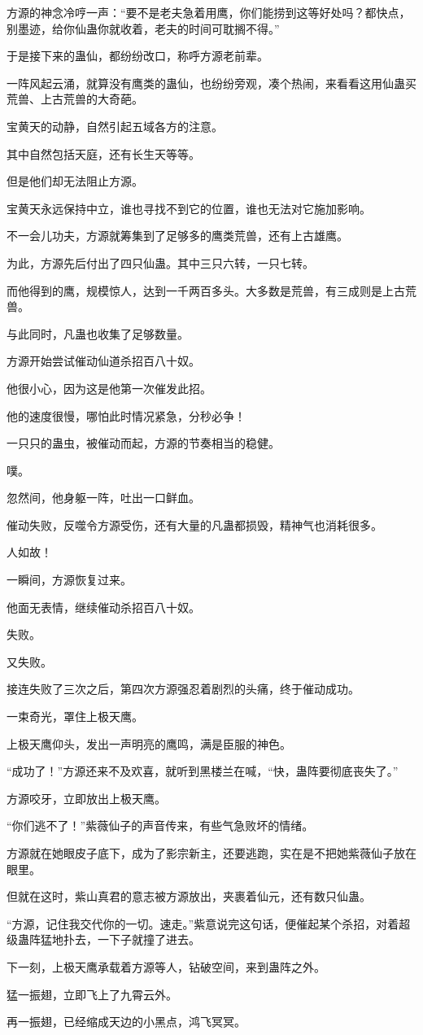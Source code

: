 \begin{this_body}
方源的神念冷哼一声：“要不是老夫急着用鹰，你们能捞到这等好处吗？都快点，别墨迹，给你仙蛊你就收着，老夫的时间可耽搁不得。”

于是接下来的蛊仙，都纷纷改口，称呼方源老前辈。

一阵风起云涌，就算没有鹰类的蛊仙，也纷纷旁观，凑个热闹，来看看这用仙蛊买荒兽、上古荒兽的大奇葩。

宝黄天的动静，自然引起五域各方的注意。

其中自然包括天庭，还有长生天等等。

但是他们却无法阻止方源。

宝黄天永远保持中立，谁也寻找不到它的位置，谁也无法对它施加影响。

不一会儿功夫，方源就筹集到了足够多的鹰类荒兽，还有上古雄鹰。

为此，方源先后付出了四只仙蛊。其中三只六转，一只七转。

而他得到的鹰，规模惊人，达到一千两百多头。大多数是荒兽，有三成则是上古荒兽。

与此同时，凡蛊也收集了足够数量。

方源开始尝试催动仙道杀招百八十奴。

他很小心，因为这是他第一次催发此招。

他的速度很慢，哪怕此时情况紧急，分秒必争！

一只只的蛊虫，被催动而起，方源的节奏相当的稳健。

噗。

忽然间，他身躯一阵，吐出一口鲜血。

催动失败，反噬令方源受伤，还有大量的凡蛊都损毁，精神气也消耗很多。

人如故！

一瞬间，方源恢复过来。

他面无表情，继续催动杀招百八十奴。

失败。

又失败。

接连失败了三次之后，第四次方源强忍着剧烈的头痛，终于催动成功。

一束奇光，罩住上极天鹰。

上极天鹰仰头，发出一声明亮的鹰鸣，满是臣服的神色。

“成功了！”方源还来不及欢喜，就听到黑楼兰在喊，“快，蛊阵要彻底丧失了。”

方源咬牙，立即放出上极天鹰。

“你们逃不了！”紫薇仙子的声音传来，有些气急败坏的情绪。

方源就在她眼皮子底下，成为了影宗新主，还要逃跑，实在是不把她紫薇仙子放在眼里。

但就在这时，紫山真君的意志被方源放出，夹裹着仙元，还有数只仙蛊。

“方源，记住我交代你的一切。速走。”紫意说完这句话，便催起某个杀招，对着超级蛊阵猛地扑去，一下子就撞了进去。

下一刻，上极天鹰承载着方源等人，钻破空间，来到蛊阵之外。

猛一振翅，立即飞上了九霄云外。

再一振翅，已经缩成天边的小黑点，鸿飞冥冥。

\end{this_body}

